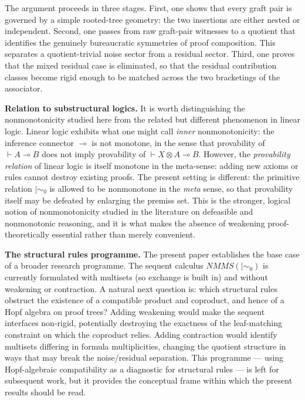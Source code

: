 \documentclass[11pt]{article}
\newcommand{\mszero}{\mathrel{\mid\!\sim_{0}}}
\newcommand{\NMMS}{\mathit{NMMS}}
\begin{document}
The argument proceeds in three stages. First, one shows that every graft pair
is governed by a simple rooted-tree geometry: the two
insertions are either nested or independent. Second, one passes from raw
graft-pair witnesses to a quotient that identifies the genuinely bureaucratic
symmetries of proof composition. This separates a quotient-trivial noise sector
from a residual sector. Third, one proves that the mixed residual case is
eliminated, so that the residual contribution classes become rigid enough to be
matched across the two bracketings of the associator.

\medskip

\noindent\textbf{Relation to substructural logics.}
It is worth distinguishing the nonmonotonicity studied here from the related
but different phenomenon in linear logic. Linear logic exhibits what one might
call \emph{inner} nonmonotonicity: the inference connector $\multimap$ is
not monotone, in the sense that provability of $\vdash A\multimap B$ does not
imply provability of $\vdash X\otimes A\multimap B$. However, the
\emph{provability relation} of linear logic is itself monotone in the
meta-sense: adding new axioms or rules cannot destroy existing proofs.
The present setting is different: the primitive relation $\mszero$ is allowed
to be nonmonotone in the \emph{meta} sense, so that provability itself may be
defeated by enlarging the premiss set. This is the stronger, logical notion of
nonmonotonicity studied in the literature on defeasible and nonmonotonic
reasoning, and it is what makes the absence of weakening proof-theoretically
essential rather than merely convenient.

\medskip

\noindent\textbf{The structural rules programme.}
The present paper establishes the base case of a broader research programme.
The sequent calculus $\NMMS(\mszero)$ is currently formulated with multisets
(so exchange is built in) and without weakening or contraction. A natural
next question is: which structural rules obstruct the existence of a compatible
product and coproduct, and hence of a Hopf algebra on proof trees? Adding
weakening would make the sequent interfaces non-rigid, potentially destroying
the exactness of the leaf-matching constraint on which the coproduct relies.
Adding contraction would identify multisets differing in formula multiplicities,
changing the quotient structure in ways that may break the noise/residual
separation. This programme --- using Hopf-algebraic compatibility as a
diagnostic for structural rules --- is left for subsequent work, but it
provides the conceptual frame within which the present results should be read.
\end{document}
